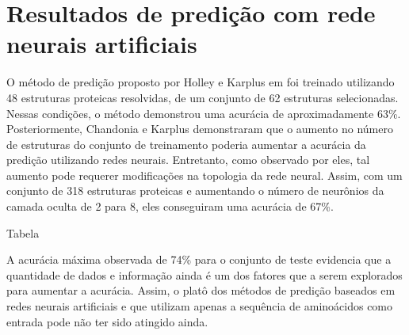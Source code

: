 \section{Resultados de predição com rede neurais artificiais}

O método de predição proposto por Holley e Karplus em \citeyear{key} foi treinado utilizando 48 estruturas proteicas resolvidas, de um conjunto de 62 estruturas selecionadas. Nessas condições, o método demonstrou uma acurácia de aproximadamente 63\%. Posteriormente, Chandonia e Karplus \citeyear{10.1002/pro.5560050422} demonstraram que o aumento no número de estruturas do conjunto de treinamento poderia aumentar a acurácia da predição utilizando redes neurais. Entretanto, como observado por eles, tal aumento pode requerer modificações na topologia da rede neural. Assim, com um conjunto de 318 estruturas proteicas e aumentando o número de neurônios da camada oculta de 2 para 8, eles conseguiram uma acurácia de 67\%.


Tabela 



A acurácia máxima observada de 74\% para o conjunto de teste evidencia que a quantidade de dados e informação ainda é um dos fatores que a serem explorados para aumentar a acurácia. Assim, o platô dos métodos de predição baseados em redes neurais artificiais e que utilizam apenas a sequência de aminoácidos como entrada pode não ter sido atingido ainda.





